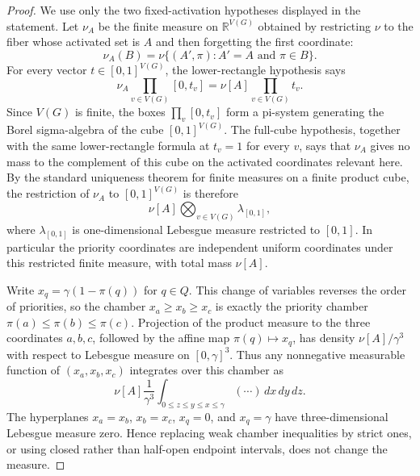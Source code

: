 \begin{proof}
We use only the two fixed-activation hypotheses displayed in the statement.
Let $\nu_A$ be the finite measure on $\mathbb R^{V(G)}$ obtained by restricting
$\nu$ to the fiber whose activated set is $A$ and then forgetting the first
coordinate:
\[
\nu_A(B)=\nu\{(A',\pi): A'=A\text{ and }\pi\in B\}.
\]
For every vector $t\in[0,1]^{V(G)}$, the lower-rectangle hypothesis says
\[
\nu_A\prod_{v\in V(G)}[0,t_v]
=\nu[A]\prod_{v\in V(G)}t_v .
\]
Since $V(G)$ is finite, the boxes $\prod_v[0,t_v]$ form a pi-system generating
the Borel sigma-algebra of the cube $[0,1]^{V(G)}$.  The full-cube hypothesis,
together with the same lower-rectangle formula at $t_v=1$ for every $v$, says
that $\nu_A$ gives no mass to the complement of this cube on the activated
coordinates relevant here.  By the standard uniqueness theorem for finite
measures on a finite product cube, the restriction of $\nu_A$ to
$[0,1]^{V(G)}$ is therefore
\[
\nu[A]\bigotimes_{v\in V(G)}\lambda_{[0,1]},
\]
where $\lambda_{[0,1]}$ is one-dimensional Lebesgue measure restricted to
$[0,1]$.  In particular the priority coordinates are independent uniform
coordinates under this restricted finite measure, with total mass $\nu[A]$.

Write $x_q=\gamma(1-\pi(q))$ for $q\in Q$.  This change of variables reverses
the order of priorities, so the chamber $x_a\ge x_b\ge x_c$ is exactly the
priority chamber $\pi(a)\le\pi(b)\le\pi(c)$.  Projection of the product measure
to the three coordinates $a,b,c$, followed by the affine map
$\pi(q)\mapsto x_q$, has density $\nu[A]/\gamma^3$ with respect to Lebesgue
measure on $[0,\gamma]^3$.  Thus any nonnegative measurable function of
$(x_a,x_b,x_c)$ integrates over this chamber as
\[
\nu[A]\frac1{\gamma^3}
\int_{0\le z\le y\le x\le \gamma}(\cdots)\,dx\,dy\,dz .
\]
The hyperplanes $x_a=x_b$, $x_b=x_c$, $x_q=0$, and $x_q=\gamma$ have
three-dimensional Lebesgue measure zero.  Hence replacing weak chamber
inequalities by strict ones, or using closed rather than half-open endpoint
intervals, does not change the measure.


\end{proof}
